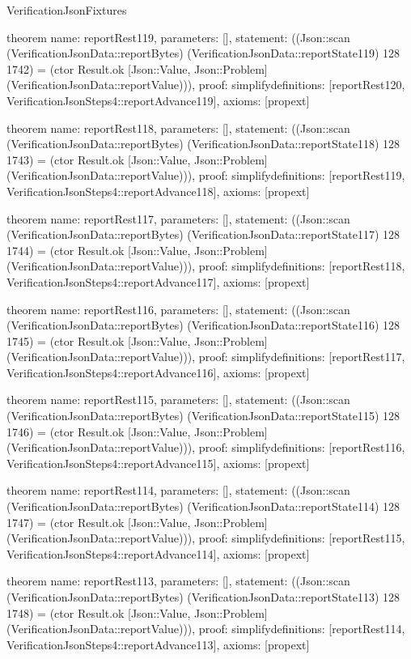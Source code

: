 \begin{lexlean}{VerificationJsonFixtures}
\begin{semanticmodule}
theorem{
  name: reportRest119,
  parameters: [],
  statement: ((Json::scan (VerificationJsonData::reportBytes) (VerificationJsonData::reportState119) 128 1742) = (ctor Result.ok [Json::Value, Json::Problem] (VerificationJsonData::reportValue))),
  proof: simplify{definitions: [reportRest120, VerificationJsonSteps4::reportAdvance119]},
  axioms: [propext]
}

theorem{
  name: reportRest118,
  parameters: [],
  statement: ((Json::scan (VerificationJsonData::reportBytes) (VerificationJsonData::reportState118) 128 1743) = (ctor Result.ok [Json::Value, Json::Problem] (VerificationJsonData::reportValue))),
  proof: simplify{definitions: [reportRest119, VerificationJsonSteps4::reportAdvance118]},
  axioms: [propext]
}

theorem{
  name: reportRest117,
  parameters: [],
  statement: ((Json::scan (VerificationJsonData::reportBytes) (VerificationJsonData::reportState117) 128 1744) = (ctor Result.ok [Json::Value, Json::Problem] (VerificationJsonData::reportValue))),
  proof: simplify{definitions: [reportRest118, VerificationJsonSteps4::reportAdvance117]},
  axioms: [propext]
}

theorem{
  name: reportRest116,
  parameters: [],
  statement: ((Json::scan (VerificationJsonData::reportBytes) (VerificationJsonData::reportState116) 128 1745) = (ctor Result.ok [Json::Value, Json::Problem] (VerificationJsonData::reportValue))),
  proof: simplify{definitions: [reportRest117, VerificationJsonSteps4::reportAdvance116]},
  axioms: [propext]
}

theorem{
  name: reportRest115,
  parameters: [],
  statement: ((Json::scan (VerificationJsonData::reportBytes) (VerificationJsonData::reportState115) 128 1746) = (ctor Result.ok [Json::Value, Json::Problem] (VerificationJsonData::reportValue))),
  proof: simplify{definitions: [reportRest116, VerificationJsonSteps4::reportAdvance115]},
  axioms: [propext]
}

theorem{
  name: reportRest114,
  parameters: [],
  statement: ((Json::scan (VerificationJsonData::reportBytes) (VerificationJsonData::reportState114) 128 1747) = (ctor Result.ok [Json::Value, Json::Problem] (VerificationJsonData::reportValue))),
  proof: simplify{definitions: [reportRest115, VerificationJsonSteps4::reportAdvance114]},
  axioms: [propext]
}

theorem{
  name: reportRest113,
  parameters: [],
  statement: ((Json::scan (VerificationJsonData::reportBytes) (VerificationJsonData::reportState113) 128 1748) = (ctor Result.ok [Json::Value, Json::Problem] (VerificationJsonData::reportValue))),
  proof: simplify{definitions: [reportRest114, VerificationJsonSteps4::reportAdvance113]},
  axioms: [propext]
}


\end{semanticmodule}
\end{lexlean}
